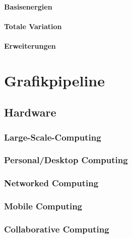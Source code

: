 \documentclass[a4paper, 11pt, accentcolor = tud3b]{tudreport}
\begin{document}
				\subsubsection{Basisenergien} %

				\subsubsection{Totale Variation} %

				\subsubsection{Erweiterungen} %

	\chapter{Grafikpipeline} %

		\section{Hardware} %

			\subsection{Large-Scale-Computing} %

			\subsection{Personal/Desktop Computing} %

			\subsection{Networked Computing} %

			\subsection{Mobile Computing} %

			\subsection{Collaborative Computing} %
\end{document}
